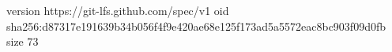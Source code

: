 version https://git-lfs.github.com/spec/v1
oid sha256:d87317e191639b34b056f4f9e420ae68e125f173ad5a5572eac8bc903f09d0fb
size 73
